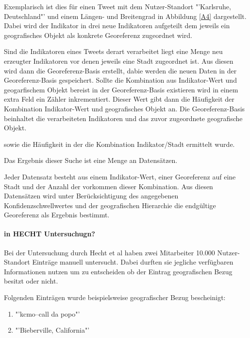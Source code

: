 	Exemplarisch ist dies für einen Tweet mit dem Nutzer-Standort "'Karlsruhe, Deutschland"' und einem Längen- und Breitengrad in Abbildung \ref{A4} dargestellt.
	Dabei wird der Indikator in drei neue Indikatoren aufgeteilt dem jeweils ein geografisches Objekt als konkrete Georeferenz zugeordnet wird.
	
	Sind die Indikatoren eines Tweets derart verarbeitet liegt eine Menge neu erzeugter Indikatoren vor denen jeweils eine Stadt zugeordnet ist.
	Aus diesen wird dann die Georeferenz-Basis erstellt, dabie werden die neuen Daten in der Georeferenz-Basis gespeichert.
	Sollte die Kombination aus Indikator-Wert und geogarfischem Objekt bereist in der Georeferenz-Basis existieren wird in einem extra Feld ein Zähler inkrementiert.
	Dieser Wert gibt dann die Häufigkeit der Kombination Indikator-Wert und geografisches Objekt an. 
	Die Georeferenz-Basis beinhaltet die verarbeiteten Indikatoren und das zuvor zugeordnete geografische Objekt.

	sowie die Häufigkeit in der die Kombination Indikator/Stadt ermittelt wurde.
	

	Das Ergebnis dieser Suche ist eine Menge an Datensätzen.
	
	Jeder Datensatz besteht aus einem Indikator-Wert, einer Georeferenz auf eine Stadt und der Anzahl der vorkommen dieser Kombination.  
	Aus diesen Datensätzen wird unter Berücksichtigung des angegebenen Konfidenzschwellwertes und der geografischen Hierarchie die endgültige Georeferenz als Ergebnis bestimmt.  



\paragraph{in HECHT Untersuchugn?}

Bei der Untersuchung durch Hecht et al haben zwei Mitarbeiter 10.000 Nutzer-Standort Einträge manuell untersucht.
						Dabei durften sie jegliche verfügbaren Informationen nutzen um zu entscheiden ob der Eintrag geografischen Bezug besitzt oder nicht. 

						Folgenden Einträgen wurde beispielsweise geografischer Bezug bescheinigt:

						\begin{enumerate}
							\item "'kcmo--call da popo"'
							\item "'Bieberville, California"'
						\end{enumerate}   


